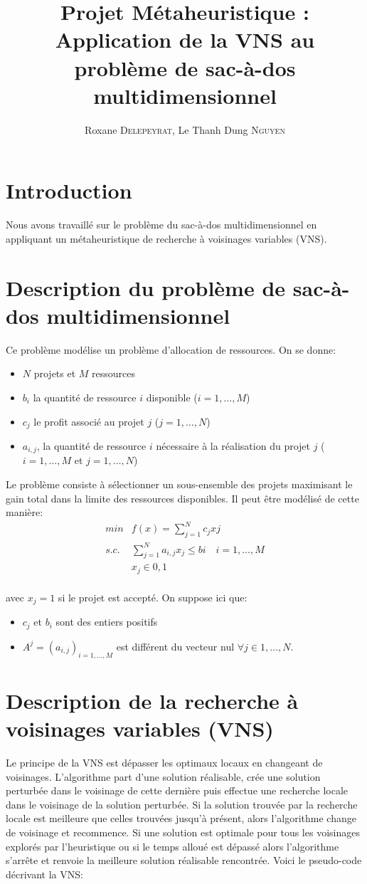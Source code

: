 \documentclass[fleqn]{article}
\title{Projet Métaheuristique : \\Application de la VNS au problème de sac-à-dos multidimensionnel}
\author{Roxane \textsc{Delepeyrat}, Le Thanh Dung \textsc{Nguyen} }
\begin{document}
\maketitle
\renewcommand{\contentsname}{Sommaire}
\tableofcontents
\newpage
\section*{Introduction}
Nous avons travaillé sur le problème du sac-à-dos multidimensionnel en  appliquant un métaheuristique de recherche à voisinages variables (VNS). 
\section{Description du problème de sac-à-dos multidimensionnel}
Ce problème modélise un problème d'allocation de ressources. On se donne:
\begin{itemize}
\item $N$ projets et $M$ ressources
\item $b_{i}$ la quantité de ressource $i$ disponible ($i=1,\ldots,M$)
\item $c_{j}$ le profit associé au projet $j$ ($j=1,\ldots,N$)
\item $a_{i,j}$, la quantité de ressource $i$ nécessaire à la réalisation du projet $j$ ($i=1,\ldots,M$ et $j=1,\ldots,N$)
\end{itemize}
Le problème consiste à sélectionner un sous-ensemble des projets maximisant le gain total dans la limite des ressources disponibles. Il peut être modélisé de cette manière:
\begin{align}
 min &f(x) =\sum_{j=1}^{N}c_{j}x{j}\\
 s.c. & \sum_{j=1}^{N} a_{i,j}x_{j}\leq b{i} \quad i=1,\ldots,M\\
& x_{j}\in {0,1}\\
\end{align}

avec $x_{j}=1$ si le projet est accepté.
On suppose ici que:
\begin{itemize}
\item $c_{j}$ et $b_{i}$ sont des entiers positifs 
\item $A^{j}=(a_{i,j})_{i=1,\ldots,M}$ est différent du vecteur nul $\forall j \in {1,\ldots,N}$.
\end{itemize}

\section{Description de la recherche à voisinages variables (VNS)}
Le principe de la VNS est dépasser les optimaux locaux en changeant de voisinages. L'algorithme part d'une solution réalisable, crée une solution perturbée dans le voisinage de cette dernière puis effectue une recherche locale dans le voisinage de la solution perturbée. Si la solution trouvée par la recherche locale est meilleure que celles trouvées jusqu'à présent, alors l'algorithme change de voisinage et recommence. Si une solution est optimale pour tous les voisinages explorés par l'heuristique ou si le temps alloué est dépassé alors l'algorithme s'arrête et renvoie la meilleure solution réalisable rencontrée.
Voici le pseudo-code décrivant la VNS:
\end{document}
